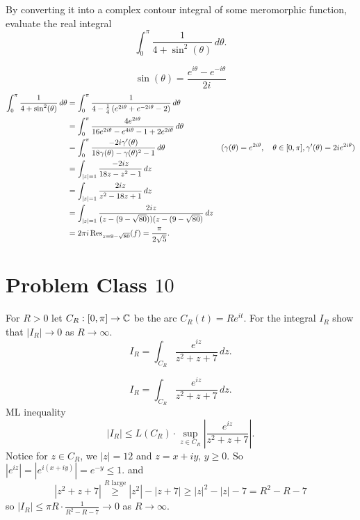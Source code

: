\documentclass[10pt, a4paper]{article}
\begin{document}
\begin{problem}
    By converting it into a complex contour integral of some meromorphic function,
    evaluate the real integral
    \[
    \int_{0}^{\pi}\frac{1}{4 + \sin ^ 2(\theta)}\,d\theta.
    \]

    \begin{solution}
        \[
        \sin(\theta) = \frac{e ^ {i\theta} - e ^ {-i\theta}}{2i}
        \]
        \begin{align*}
            \int_{0}^{\pi}\frac{1}{4 + \sin ^ 2(\theta)}\,d\theta &= \int_{0}^{\pi}\frac{1}{4 - \frac{1}{4}\left(e ^ {2i\theta} + e ^ {-2i\theta} - 2\right)}\,d\theta \\
            &= \int_{0}^{\pi}\frac{4e ^ {2i\theta}}{16e ^ {2i\theta} - e ^ {4i\theta} - 1 + 2e ^ {2i\theta}}\,d\theta \\
            &= \int_{0}^{\pi}\frac{-2i\gamma'(\theta)}{18\gamma(\theta) - \gamma(\theta) ^ 2 - 1}\,d\theta &(\gamma(\theta) = e ^ {2i\theta},\quad \theta \in [0, \pi], \gamma'(\theta) = 2ie ^ {2i\theta}) \\
            &= \int_{|z| = 1}\frac{-2iz}{18z - z ^ 2 - 1}\,dz \\
            &= \int_{|z| = 1}\frac{2iz}{z ^ 2 - 18z + 1}\,dz \\
            &= \int_{|z| = 1}\frac{2iz}{(z - (9 - \sqrt{80}))(z - (9 - \sqrt{80})}\,dz \\
            &= 2\pi i\operatorname{Res}_{z = 9 - \sqrt{80}}(f) = \frac{\pi}{2\sqrt{5}}.
        \end{align*}
    \end{solution}
\end{problem}

\newpage

\section{Problem Class \texorpdfstring{$10$}{}}

\begin{problem}
    For $R > 0$ let $C_R : [0, \pi] \to \mathbb{C}$ be the arc $C_R(t) = Re ^ {it}$.
    For the integral $I_R$ show that $|I_R| \to 0$ as $R \to \infty$.
    \[
    I_R = \int_{C_R}\frac{e ^ {iz}}{z ^ 2 + z + 7}\,dz.
    \]

    \begin{solution}
        \[
        I_R = \int_{C_R}\frac{e ^ {iz}}{z ^ 2 + z + 7}\,dz.
        \]
        ML inequality
        \[
        |I_R| \leq L(C_R) \cdot \sup_{z \in C_R}\left|\frac{e ^ {iz}}{z ^ 2 + z + 7}\right|.
        \]
        Notice for $z \in C_R$,
        we $|z| = 12$ and $z = x + iy$,
        $y \geq 0$.
        So $|e ^ {iz}| = |e ^ {i(x + iy)}| = e ^ {-y} \leq 1$.
        and
        \[
        |z ^ 2 + z + 7| \overset{R\text{ large}}{\geq} |z ^ 2| - |z + 7| \geq |z| ^ 2 - |z| - 7 = R ^ 2 - R - 7
        \]
        so $|I_R| \leq \pi R\cdot\frac{1}{R ^ 2 - R - 7} \to 0$ as $R \to \infty$.
    \end{solution}
\end{problem}
\end{document}
